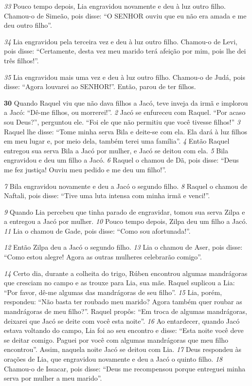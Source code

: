 \bigskip   
\textit{\tiny 33}
Pouco tempo depois, Lia engravidou novamente e deu à luz outro filho.
Chamou-o de Simeão, pois disse: “O SENHOR ouviu que eu não era amada e me
deu outro filho”.

\bigskip   
\textit{\tiny 34}
Lia engravidou pela terceira vez e deu à luz outro filho. Chamou-o de Levi,
pois disse: “Certamente, desta vez meu marido terá afeição por mim, pois lhe dei
três filhos!”.

\bigskip   
\textit{\tiny 35}
Lia engravidou mais uma vez e deu à luz outro filho. Chamou-o de Judá,
pois disse: “Agora louvarei ao SENHOR!”. Então, parou de ter filhos.

\bigskip   
\textbf{\large 30}
 Quando Raquel viu que não dava filhos a Jacó, teve inveja da irmã e
implorou a Jacó: “Dê-me filhos, ou morrerei!”.
\textit{\tiny 2} 
Jacó se enfureceu com Raquel. “Por acaso sou Deus?”, perguntou ele. “Foi ele
que não permitiu que você tivesse filhos!”
\textit{\tiny 3} 
Raquel lhe disse: “Tome minha serva Bila e deite-se com ela. Ela dará à luz
filhos em meu lugar e, por meio dela, também terei uma família”. 
\textit{\tiny 4} 
Então Raquel
entregou sua serva Bila a Jacó por mulher, e Jacó se deitou com ela. 
\textit{\tiny 5} 
Bila
engravidou e deu um filho a Jacó. 
\textit{\tiny 6} 
Raquel o chamou de Dã, pois disse: “Deus
me fez justiça! Ouviu meu pedido e me deu um filho!”. 

\bigskip   
\textit{\tiny 7} 
Bila engravidou
novamente e deu a Jacó o segundo filho. 
\textit{\tiny 8} 
Raquel o chamou de Naftali,
pois
disse: “Tive uma luta intensa com minha irmã e venci!”.

\bigskip   
\textit{\tiny 9} 
Quando Lia percebeu que tinha parado de engravidar, tomou sua serva Zilpa e
a entregou a Jacó por mulher. 
\textit{\tiny 10}
Pouco tempo depois, Zilpa deu um filho a Jacó.
\textit{\tiny 11}
Lia o chamou de Gade,
pois disse: “Como sou afortunada!”. 

\bigskip   
\textit{\tiny 12}
Então Zilpa deu
a Jacó o segundo filho. 
\textit{\tiny 13}
Lia o chamou de Aser,
pois disse: “Como estou alegre!
Agora as outras mulheres celebrarão comigo”.

\bigskip   
\textit{\tiny 14}
Certo dia, durante a colheita do trigo, Rúben encontrou algumas
mandrágoras que cresciam no campo e as trouxe para Lia, sua mãe. Raquel
suplicou a Lia: “Por favor, dê-me algumas das mandrágoras de seu filho”.
\textit{\tiny 15}
Lia, porém, respondeu: “Não basta ter roubado meu marido? Agora também
quer roubar as mandrágoras de meu filho?”.
   Raquel propôs: “Em troca de algumas mandrágoras, deixarei que Jacó se deite
com você esta noite”.
\textit{\tiny 16}
Ao   entardecer, quando Jacó estava voltando do campo, Lia foi ao seu
encontro e disse: “Esta noite você deve se deitar comigo. Paguei por você com
algumas mandrágoras que meu filho encontrou”. Assim, naquela noite Jacó se
deitou com Lia. 
\textit{\tiny 17}
Deus respondeu às orações de Lia, que engravidou novamente e
deu a Jacó o quinto filho. 
\textit{\tiny 18}
Chamou-o de Issacar,
pois disse: “Deus me
recompensou porque entreguei minha serva por mulher a meu marido”. 

